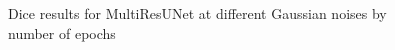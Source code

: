 \begin{figure}
    \centerline{}
    \caption{Dice results for MultiResUNet at different Gaussian noises by number of epochs}
    \label{fig:all-noises-by-epoch-dice-multiresunet}
\end{figure}

